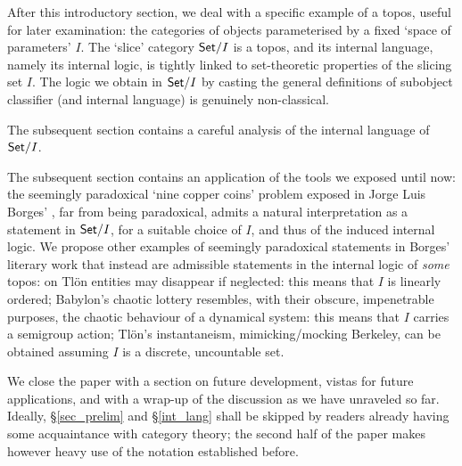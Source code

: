
After this introductory section, we deal with a specific example of a topos, useful for later examination: the categories of objects parameterised by a fixed `space of parameters' $I$. The `slice' category $\mathsf{Set}/I$ is a topos, and its internal language, namely its internal logic, is tightly linked to set-theoretic properties of the slicing set $I$. The logic we obtain in $\mathsf{Set}/I$ by casting the general definitions of subobject classifier (and internal language) is genuinely non-classical.

The subsequent section contains a careful analysis of the internal language of $\mathsf{Set}/I$.

The subsequent section contains an application of the tools we exposed until now: the seemingly paradoxical `nine copper coins' problem exposed in Jorge Luis Borges' \cite{Borges1963}, far from being paradoxical, admits a natural interpretation as a statement in $\mathsf{Set}/I$, for a suitable choice of $I$, and thus of the induced internal logic. We propose other examples of seemingly paradoxical statements in Borges' literary work that instead are admissible statements in the internal logic of \emph{some} topos: on Tl\"on entities may disappear if neglected: this means that $I$ is linearly ordered; Babylon's chaotic lottery resembles, with their obscure, impenetrable purposes, the chaotic behaviour of a dynamical system: this means that $I$ carries a semigroup action; Tl\"on's instantaneism, mimicking/mocking Berkeley, can be obtained assuming $I$ is a discrete, uncountable set.

We close the paper with a section on future development, vistas for future applications, and with a wrap-up of the discussion as we have unraveled so far. Ideally, §\ref{sec_prelim} and §\ref{int_lang} shall be skipped by readers already having some acquaintance with category theory; the second half of the paper makes however heavy use of the notation established before.